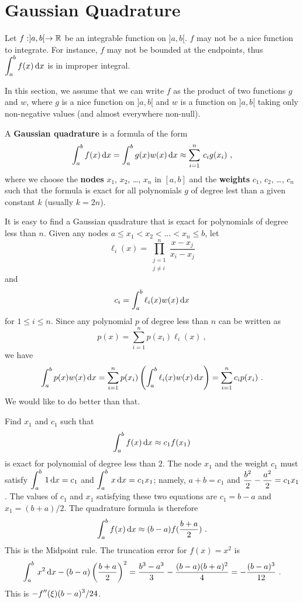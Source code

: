 \section{Gaussian Quadrature}\label{GaussGuadrSect}

Let $f:]a,b[ \rightarrow \mathbb{R}$ be an integrable function on $]a,b[$.
$f$ may not be a nice function to integrate.  For instance, $f$ may
not be bounded at the endpoints, thus
$\displaystyle \int_a^b f(x) \,\mathrm{d}x$ is in improper integral.

In this section, we assume that we can write $f$ as the product of two
functions $g$ and $w$, where $g$ is a nice function on $]a,b[$
and $w$ is a function on $]a,b[$ taking only non-negative values (and
almost everywhere non-null).

\begin{defn}
A {\bfseries Gaussian quadrature} is a formula of the form 
\begin{equation} \label{GG}
\int_a^b f(x) \,\mathrm{d}x = \int_a^b g(x)w(x) \,\mathrm{d}x \approx
\sum_{i=1}^n \,c_i g(x_i) \ ,
\end{equation}
where we choose the {\bfseries nodes} $x_1$,
$x_2$, \ldots, $x_n$ in $[a,b]$ and the
{\bfseries weights} $c_1$, $c_2$, \ldots,
$c_n$ such that the formula is exact for all polynomials $g$ of degree
lest than a given constant $k$ (usually $k = 2n$).
\end{defn}

It is easy to find a Gaussian quadrature that is exact for polynomials
of degree less than $n$.  Given any nodes
$a \leq x_1 < x_2 < \ldots < x_n \leq b$, let
\[
 \ell_i(x) =  \prod_{\substack{j=1 \\ j\neq i}}^n   \frac{x-x_j}{x_i-x_j}
\]
and
\begin{equation}\label{GquadrCoeff}
    c_i = \int_a^b \ell_i(x)  w(x) \,\mathrm{d}x
\end{equation}
for $1\leq i \leq n$.  Since any polynomial $p$ of degree less than $n$
can be written as
\[
p(x) = \sum_{i=1}^n p(x_i) \ell_i(x) \ ,
\]
we have
\[
\int_a^b p(x) w(x) \,\mathrm{d}x = 
\sum_{i=1}^n p(x_i) \left( \int_a^b \ell_i(x) w(x) \,\mathrm{d}x \right)
= \sum_{i=1}^n c_i p(x_i) \ .
\]
We would like to do better than that.

\begin{egg}
Find $x_1$ and $c_1$ such that
\[
\int_a^b f(x) \,\mathrm{d}x \approx c_1 f(x_1)
\]
is exact for polynomial of degree less than $2$.  The node $x_1$ and
the weight $c_1$ must satisfy
$\displaystyle \int_a^b\, 1 \,\mathrm{d}x = c_1$ and
$\displaystyle \int_a^b\, x \,\mathrm{d}x = c_1 x_1$; namely,
$a+b = c_1$ and $\displaystyle \frac{b^2}{2} - \frac{a^2}{2} = c_1 x_1$.
The values of $c_1$ and $x_1$ satisfying these two equations are $c_1
= b - a$ and $x_1 = (b+a)/2$.  The quadrature formula is therefore
\[
\int_a^b f(x) \,\mathrm{d}x \approx  (b-a) f(\frac{b+a}{2}) \ .
\]
This is the Midpoint rule.  The truncation error for $f(x) = x^2$ is
\[
\int_a^b \, x^2 \dx{x} - (b-a) \left( \frac{b+a}{2} \right)^2 =
\frac{b^3-a^3}{3} - \frac{(b-a)(b+a)^2}{4} = - \frac{(b-a)^3}{12} \ .
\]
This is $\displaystyle -f''(\xi) (b-a)^3/24$.
\end{egg}

